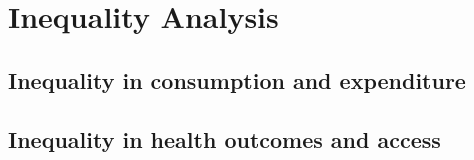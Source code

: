 \section{Inequality Analysis}
\subsection{Inequality in consumption and expenditure}
\subsection{Inequality in health outcomes and access}